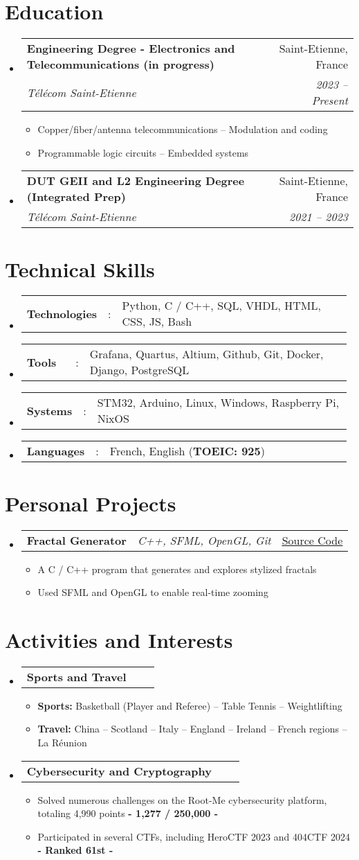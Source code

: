 \documentclass[a4paper,11pt]{article}
\makeatletter
\newcommand{\resumeItem}[1]{
  \item\small{#1} }
\newcommand{\resumeItemListStart}{\begin{itemize}[rightmargin=0.11in]}
\newcommand{\resumeItemListEnd}{\end{itemize}}
\newcommand{\resumeSectionType}[3]{
  \item\begin{tabular*}{0.995\textwidth}[t]{ p{0.15\linewidth}p{0.02\linewidth}p{0.81\linewidth} }
    \textbf{#1} & #2 & #3 \end{tabular*}\vspace{-4pt} }
\newcommand{\resumeTrioHeading}[3]{
  \item\small{
    \begin{tabular*}{0.995\textwidth}[t]{ l@{\extracolsep{\fill}}c@{\extracolsep{\fill}}r }
      \textbf{#1} & \textit{#2} & #3
    \end{tabular*}
  } }
\newcommand{\resumeQuadHeading}[4]{
  \item
  \begin{tabular*}{0.995\textwidth}[t]{l@{\extracolsep{\fill}}r} \textbf{#1} & #2 \\
    \textit{\small#3} & \textit{\small #4} \\
  \end{tabular*}
}
\newcommand{\resumeHeadingListStart}{
  \begin{itemize}[leftmargin=0.0in, label={}]
} \newcommand{\resumeHeadingListEnd}{\end{itemize}}
\makeatother
\begin{document}
\vspace{-15pt}
\section{Education}
\resumeHeadingListStart{}
\resumeQuadHeading{Engineering Degree - Electronics and Telecommunications (in progress)}{Saint-Etienne, France}{Télécom Saint-Etienne}{2023 -- Present}
\resumeItemListStart{}
\vspace{-5pt}
\resumeItem{Copper/fiber/antenna telecommunications – Modulation and coding}
\resumeItem{Programmable logic circuits – Embedded systems}
\resumeItemListEnd{}
\resumeQuadHeading{DUT GEII and L2 Engineering Degree (Integrated Prep)}{Saint-Etienne, France}{Télécom Saint-Etienne}{2021 -- 2023}
\resumeHeadingListEnd{}

\vspace{-15pt}
\section{Technical Skills}
\resumeHeadingListStart{}
\resumeSectionType{Technologies}{:}{Python, C / C++, SQL, VHDL, HTML, CSS, JS, Bash}
\resumeSectionType{Tools}{:}{Grafana, Quartus, Altium, Github, Git, Docker, Django, PostgreSQL}
\resumeSectionType{Systems}{:}{STM32, Arduino, Linux, Windows, Raspberry Pi, NixOS}
\resumeSectionType{Languages}{:}{French, English (\textbf{TOEIC: 925})}
\resumeHeadingListEnd{}

\vspace{-10pt}
\section{Personal Projects}
\resumeHeadingListStart{}
\resumeTrioHeading{Fractal Generator}{C++, SFML, OpenGL, Git}{\href{https://github.com/leoraclet/fractals}{\uline{Source Code}}}
\resumeItemListStart{}
\resumeItem{A C / C++ program that generates and explores stylized fractals}
\resumeItem{Used SFML and OpenGL to enable real-time zooming}
\resumeItemListEnd{}
\resumeHeadingListEnd{}

\vspace{-10pt}
\section{Activities and Interests}
\resumeHeadingListStart{}
\resumeTrioHeading{Sports and Travel}{}{}
\resumeItemListStart{}
\vspace{-4pt}
\resumeItem{\textbf{Sports:} Basketball (Player and Referee) – Table Tennis – Weightlifting}
\resumeItem{\textbf{Travel:} China – Scotland – Italy – England – Ireland – French regions – La Réunion}
\resumeItemListEnd{}
\resumeTrioHeading{Cybersecurity and Cryptography}{}{}
\resumeItemListStart{}
\vspace{-4pt}
\resumeItem{Solved numerous challenges on the Root-Me cybersecurity platform, totaling 4,990 points \textbf{- 1,277 / 250,000 -}}
\resumeItem{Participated in several CTFs, including HeroCTF 2023 and 404CTF 2024 \textbf{- Ranked 61st -}}
\resumeItemListEnd{}
\resumeHeadingListEnd{}
\end{document}
